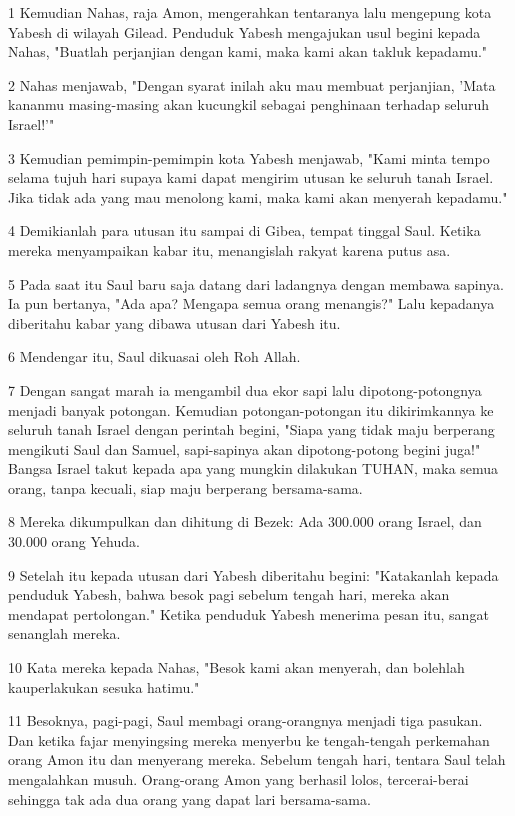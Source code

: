 \par 1 Kemudian Nahas, raja Amon, mengerahkan tentaranya lalu mengepung kota Yabesh di wilayah Gilead. Penduduk Yabesh mengajukan usul begini kepada Nahas, "Buatlah perjanjian dengan kami, maka kami akan takluk kepadamu."
\par 2 Nahas menjawab, "Dengan syarat inilah aku mau membuat perjanjian, 'Mata kananmu masing-masing akan kucungkil sebagai penghinaan terhadap seluruh Israel!'"
\par 3 Kemudian pemimpin-pemimpin kota Yabesh menjawab, "Kami minta tempo selama tujuh hari supaya kami dapat mengirim utusan ke seluruh tanah Israel. Jika tidak ada yang mau menolong kami, maka kami akan menyerah kepadamu."
\par 4 Demikianlah para utusan itu sampai di Gibea, tempat tinggal Saul. Ketika mereka menyampaikan kabar itu, menangislah rakyat karena putus asa.
\par 5 Pada saat itu Saul baru saja datang dari ladangnya dengan membawa sapinya. Ia pun bertanya, "Ada apa? Mengapa semua orang menangis?" Lalu kepadanya diberitahu kabar yang dibawa utusan dari Yabesh itu.
\par 6 Mendengar itu, Saul dikuasai oleh Roh Allah.
\par 7 Dengan sangat marah ia mengambil dua ekor sapi lalu dipotong-potongnya menjadi banyak potongan. Kemudian potongan-potongan itu dikirimkannya ke seluruh tanah Israel dengan perintah begini, "Siapa yang tidak maju berperang mengikuti Saul dan Samuel, sapi-sapinya akan dipotong-potong begini juga!" Bangsa Israel takut kepada apa yang mungkin dilakukan TUHAN, maka semua orang, tanpa kecuali, siap maju berperang bersama-sama.
\par 8 Mereka dikumpulkan dan dihitung di Bezek: Ada 300.000 orang Israel, dan 30.000 orang Yehuda.
\par 9 Setelah itu kepada utusan dari Yabesh diberitahu begini: "Katakanlah kepada penduduk Yabesh, bahwa besok pagi sebelum tengah hari, mereka akan mendapat pertolongan." Ketika penduduk Yabesh menerima pesan itu, sangat senanglah mereka.
\par 10 Kata mereka kepada Nahas, "Besok kami akan menyerah, dan bolehlah kauperlakukan sesuka hatimu."
\par 11 Besoknya, pagi-pagi, Saul membagi orang-orangnya menjadi tiga pasukan. Dan ketika fajar menyingsing mereka menyerbu ke tengah-tengah perkemahan orang Amon itu dan menyerang mereka. Sebelum tengah hari, tentara Saul telah mengalahkan musuh. Orang-orang Amon yang berhasil lolos, tercerai-berai sehingga tak ada dua orang yang dapat lari bersama-sama.
